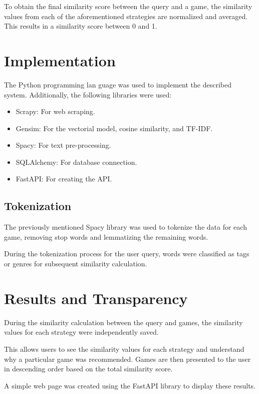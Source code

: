\documentclass{llncs}
\begin{document}
To obtain the final similarity score between the query and a game, the similarity values from each of the aforementioned strategies are normalized and averaged. This results in a similarity score between 0 and 1.

\section{Implementation}

The Python programming lan  guage was used to implement the described system. Additionally, the following libraries were used:

\begin{itemize}
    \item Scrapy: For web scraping.
    \item Gensim: For the vectorial model, cosine similarity, and TF-IDF.
    \item Spacy: For text pre-processing.
    \item SQLAlchemy: For database connection.
    \item FastAPI: For creating the API.
\end{itemize}

\subsection{Tokenization}

The previously mentioned Spacy library was used to tokenize the data for each game, removing stop words and lemmatizing the remaining words.

During the tokenization process for the user query, words were classified as tags or genres for subsequent similarity calculation.

\section{Results and Transparency}

During the similarity calculation between the query and games, the similarity values for each strategy were independently saved.

This allows users to see the similarity values for each strategy and understand why a particular game was recommended. Games are then presented to the user in descending order based on the total similarity score.

A simple web page was created using the FastAPI library to display these results.
\end{document}
